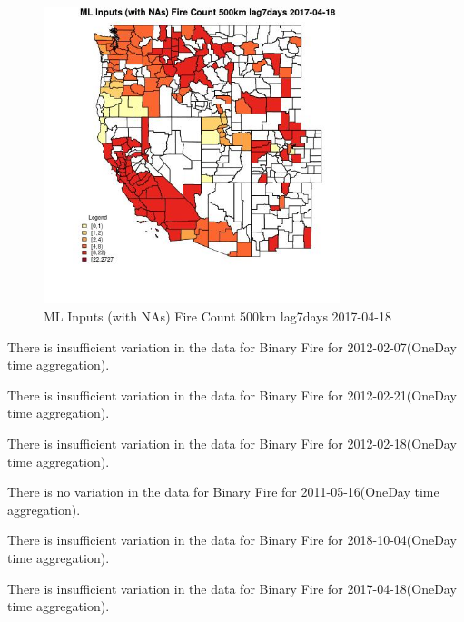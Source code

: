 \begin{figure} 
\centering  
\includegraphics[width=0.77\textwidth]{Code_Outputs/Report_ML_input_PM25_Step4_part_f_de_duplicated_aves_prioritize_24hr_obswNAs_CountyFire_Count_500km_lag7daysMean2017-04-18.jpg} 
\caption{\label{fig:Report_ML_input_PM25_Step4_part_f_de_duplicated_aves_prioritize_24hr_obswNAsCountyFire_Count_500km_lag7daysMean2017-04-18}ML Inputs (with NAs) Fire Count 500km lag7days 2017-04-18} 
\end{figure} 
 

There is insufficient variation in the data for Binary Fire for 2012-02-07(OneDay time aggregation). 
 

There is insufficient variation in the data for Binary Fire for 2012-02-21(OneDay time aggregation). 
 

There is insufficient variation in the data for Binary Fire for 2012-02-18(OneDay time aggregation). 
 

There is no variation in the data for Binary Fire for 2011-05-16(OneDay time aggregation). 
 

There is insufficient variation in the data for Binary Fire for 2018-10-04(OneDay time aggregation). 
 

There is insufficient variation in the data for Binary Fire for 2017-04-18(OneDay time aggregation). 
 

